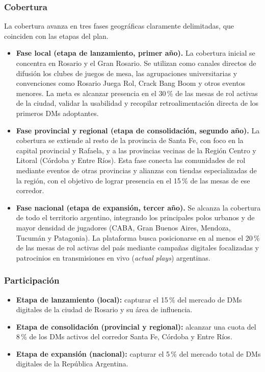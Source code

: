 \subsubsection{Cobertura}
La cobertura avanza en tres fases geográficas claramente delimitadas, que coinciden con las etapas del plan.
\begin{itemize}
  \item \textbf{Fase local (etapa de lanzamiento, primer año).} La cobertura inicial se concentra en Rosario y el Gran Rosario. Se utilizan como canales directos de difusión los clubes de juegos de mesa, las agrupaciones universitarias y convenciones como Rosario Juega Rol, Crack Bang Boom y otros eventos menores. La meta es alcanzar presencia en el 30\,\% de las mesas de rol activas de la ciudad, validar la usabilidad y recopilar retroalimentación directa de los primeros DMs adoptantes.
  \item \textbf{Fase provincial y regional (etapa de consolidación, segundo año).} La cobertura se extiende al resto de la provincia de Santa Fe, con foco en la capital provincial y Rafaela, y a las provincias vecinas de la Región Centro y Litoral (Córdoba y Entre Ríos). Esta fase conecta las comunidades de rol mediante eventos de otras provincias y alianzas con tiendas especializadas de la región, con el objetivo de lograr presencia en el 15\,\% de las mesas de ese corredor.
  \item \textbf{Fase nacional (etapa de expansión, tercer año).} Se alcanza la cobertura de todo el territorio argentino, integrando los principales polos urbanos y de mayor densidad de jugadores (CABA, Gran Buenos Aires, Mendoza, Tucumán y Patagonia). La plataforma busca posicionarse en al menos el 20\,\% de las mesas de rol activas del país mediante campañas digitales focalizadas y patrocinios en transmisiones en vivo (\textit{actual plays}) argentinas.
\end{itemize}

\subsubsection{Participación}
\begin{itemize}
  \item \textbf{Etapa de lanzamiento (local):} capturar el 15\,\% del mercado de DMs digitales de la ciudad de Rosario y su área de influencia.
  \item \textbf{Etapa de consolidación (provincial y regional):} alcanzar una cuota del 8\,\% de los DMs activos del corredor Santa Fe, Córdoba y Entre Ríos.
  \item \textbf{Etapa de expansión (nacional):} capturar el 5\,\% del mercado total de DMs digitales de la República Argentina.
\end{itemize}

